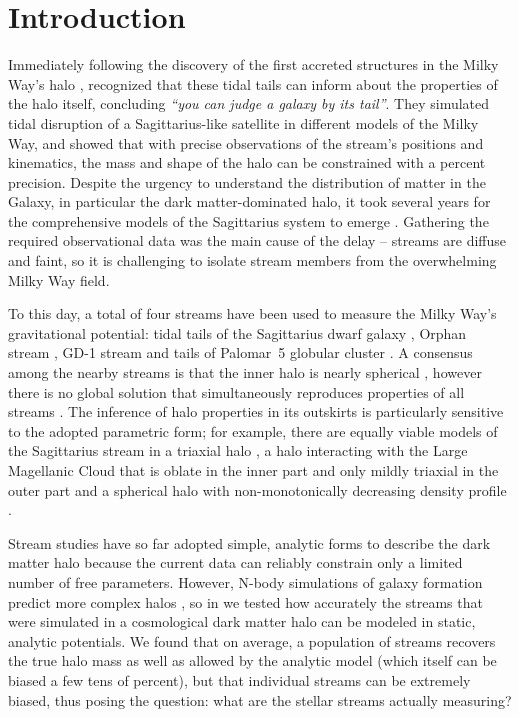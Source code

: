 \documentclass[modern]{aastex62}
\begin{document}

\section{Introduction} \label{sec:intro}
Immediately following the discovery of the first accreted structures in the Milky Way's halo \citep{ibata1994, ti1998}, \citet{johnston1999} recognized that these tidal tails can inform about the properties of the halo itself, concluding \emph{``you can judge a galaxy by its tail''}.
They simulated tidal disruption of a Sagittarius-like satellite in different models of the Milky Way, and showed that with precise observations of the stream's positions and kinematics, the mass and shape of the halo can be constrained with a percent precision.
Despite the urgency to understand the distribution of matter in the Galaxy, in particular the dark matter-dominated halo, it took several years for the comprehensive models of the Sagittarius system to emerge \citep{helmi2004, johnston2005, lm10}.
Gathering the required observational data was the main cause of the delay -- streams are diffuse and faint, so it is challenging to isolate stream members from the overwhelming Milky Way field.

To this day, a total of four streams have been used to measure the Milky Way's gravitational potential: tidal tails of the Sagittarius dwarf galaxy \citep{lm10,gibbons2014,dl2017}, Orphan stream \citep{newberg2010}, GD-1 stream \citep{koposov2010, bowden2015} and tails of Palomar~5 globular cluster \citep{kupper2015}.
A consensus among the nearby streams is that the inner halo is nearly spherical \citep{bovy2016}, however there is no global solution that simultaneously reproduces properties of all streams \citep{pearson2015}.
The inference of halo properties in its outskirts is particularly sensitive to the adopted parametric form; for example, there are equally viable models of the Sagittarius stream in a triaxial halo \citep{lm10}, a halo interacting with the Large Magellanic Cloud that is oblate in the inner part and only mildly triaxial in the outer part \citep{vch2013} and a spherical halo with non-monotonically decreasing density profile \citep{ibata2013}. 

Stream studies have so far adopted simple, analytic forms to describe the dark matter halo because the current data can reliably constrain only a limited number of free parameters.
However, N-body simulations of galaxy formation predict more complex halos \citep[e.g.,][]{diemand2007,springel2008,wetzel2016}, 
so in \citet{bonaca2014} we tested how accurately the streams that were simulated in a cosmological dark matter halo can be modeled in static, analytic potentials.
We found that on average, a population of streams recovers the true halo mass as well as allowed by the analytic model (which itself can be biased a few tens of percent), but that individual streams can be extremely biased, thus posing the question: what are the stellar streams actually measuring?
\end{document}
